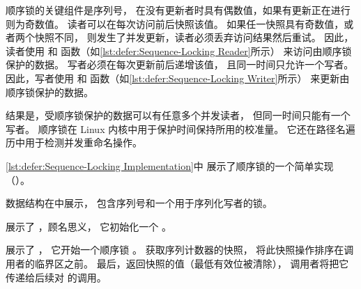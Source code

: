 顺序锁的关键组件是序列号，
在没有更新者时具有偶数值，如果有更新正在进行则为奇数值。
读者可以在每次访问前后快照该值。
如果任一快照具有奇数值，或者两个快照不同，
则发生了并发更新，读者必须丢弃访问结果然后重试。
因此，读者使用  和 
函数（如\cref{lst:defer:Sequence-Locking Reader}所示）
来访问由顺序锁保护的数据。
写者必须在每次更新前后递增该值，
且同一时间只允许一个写者。
因此，写者使用  和 
函数（如\cref{lst:defer:Sequence-Locking Writer}所示）
来更新由顺序锁保护的数据。

结果是，受顺序锁保护的数据可以有任意多个并发读者，
但同一时间只能有一个写者。
顺序锁在 Linux 内核中用于保护时间保持所用的校准量。
它还在路径名遍历中用于检测并发重命名操作。

\begin{listing}

\caption{顺序锁实现}
\label{lst:defer:Sequence-Locking Implementation}
\end{listing}

\cref{lst:defer:Sequence-Locking Implementation}中
展示了顺序锁的一个简单实现
（）。
\begin{fcvref}
 数据结构在中展示，
包含序列号和一个用于序列化写者的锁。
\end{fcvref}
\begin{fcvref}
展示了 ，顾名思义，
它初始化一个 。
\end{fcvref}

\begin{fcvref}
展示了 ，
它开始一个顺序锁
。
获取序列计数器的快照，
将此快照操作排序在调用者的临界区之前。
最后，返回快照的值（最低有效位被清除），
调用者将把它传递给后续对  的调用。
\end{fcvref}

